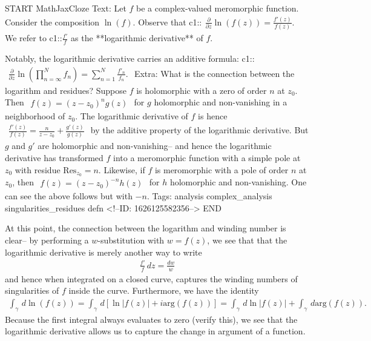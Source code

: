 \documentclass{memoir}
\begin{document}
\begin{anki}
START
MathJaxCloze
Text: Let \(f\) be a complex-valued meromorphic function. Consider the composition \(\ln(f)\). Observe that
 {{c1::\(\begin{align*}
         	\frac{\partial }{\partial z} \ln(f(z)) = \frac{f'(z)}{f(z)}.
         \end{align*}\)}} 
We refer to {{c1::\(\frac{f'}{f}\)}} as the **logarithmic derivative** of \(f\). 

Notably, the logarithmic derivative carries an additive formula:
{{c1::\(\begin{align*}
        	\frac{\partial }{\partial z} \ln\left( \prod_{n=\infty}^{N} f_n  \right) = \sum_{n=1}^{N} \frac{f'_n}{f_n}.
        \end{align*}\)}}
Extra: What is the connection between the logarithm and residues? Suppose \(f\) is holomorphic with a zero of order \(n\) at \(z_0\). Then
\(\begin{align*}
  	f(z) = (z-z_0)^{n}g(z)
  \end{align*}\)
for \(g\) holomorphic and non-vanishing in a neighborhood of \(z_0\). The logarithmic derivative of \(f\) is hence
\(\begin{align*}
  	\frac{f'(z)}{f(z)} = \frac{n}{z-z_0}+ \frac{g'(z)}{g(z)}
  \end{align*}\)
by the additive property of the logarithmic derivative. But \(g\) and \(g'\) are holomorphic and non-vanishing-- and hence the logarithmic derivative has transformed \(f\) into a meromorphic function with a simple pole at \(z_0\) with residue \(\textrm{Res}_{z_0} = n\). Likewise, if \(f\) is meromorphic with a pole of order \(n\) at \(z_0\), then
\(\begin{align*}
  	f(z) = (z-z_0)^{-n}h(z)
  \end{align*}\)
for \(h\) holomorphic and non-vanishing. One can see the above follows but with \(-n\).
Tags: analysis complex_analysis singularities_residues defn
<!--ID: 1626125582356-->
END
\end{anki}


At this point, the connection between the logarithm and winding number is clear-- by performing a \(w\)-substitution with \(w = f(z)\), we see that that the logarithmic derivative is merely another way to write
\begin{align*}
	\frac{f'}{f} \,d z = \frac{dw}{w}
\end{align*}
and hence when integrated on a closed curve, captures the winding numbers of singularities of \(f\) inside the curve. Furthermore, we have the identity
\begin{align*}
	\int_\gamma \,d \ln(f(z)) = \int_\gamma \,d \left[ \ln \left| f(z) \right| + i \textrm{arg}(f(z)) \right] = \int_\gamma \,d \ln\left| f(z) \right| + \int_\gamma \,d \textrm{arg}(f(z)).
\end{align*}
Because the first integral always evaluates to zero (verify this), we see that the logarithmic derivative allows us to capture the change in argument of a function.\\
\end{document}
